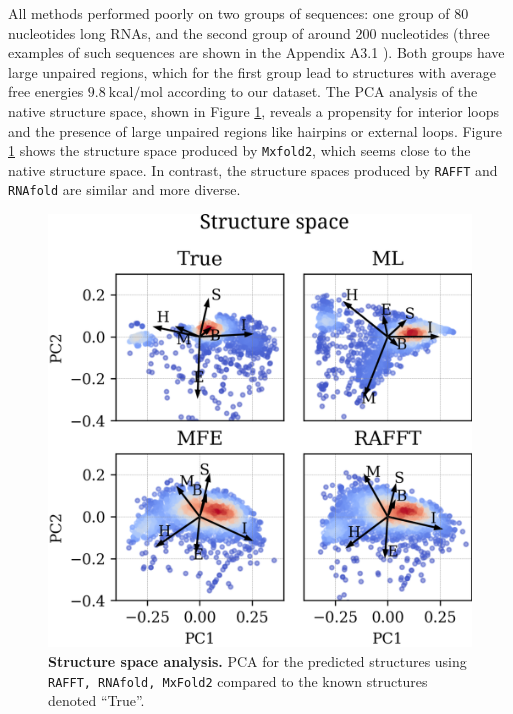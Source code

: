 All methods performed poorly on two groups of sequences: one group of $80$ nucleotides long RNAs, and the second group of around $200$ nucleotides (three examples of such sequences are shown in the Appendix A3.1 ). Both groups have large unpaired regions, which for the first group lead to structures with average free energies $9.8\ \textrm{kcal/mol}$ according to our dataset. The PCA analysis of the native structure space, shown in Figure \ref{perf_pca}, reveals a propensity for interior loops and the presence of large unpaired regions like hairpins or external loops. Figure \ref{perf_pca} shows the structure space produced by \texttt{Mxfold2}, which seems close to the native structure space. In contrast, the structure spaces produced by \texttt{RAFFT} and \texttt{RNAfold} are similar and more diverse.
\begin{figure}[t!]
	\centering
	\includegraphics[width=.9\linewidth]{../res/images/rafft/perf_pca.png}
	\caption{\label{perf_pca} \textbf{Structure space analysis.} PCA for the
		predicted structures using \texttt{RAFFT, RNAfold, MxFold2} compared to the
		known structures denoted ``True''.}
\end{figure}
